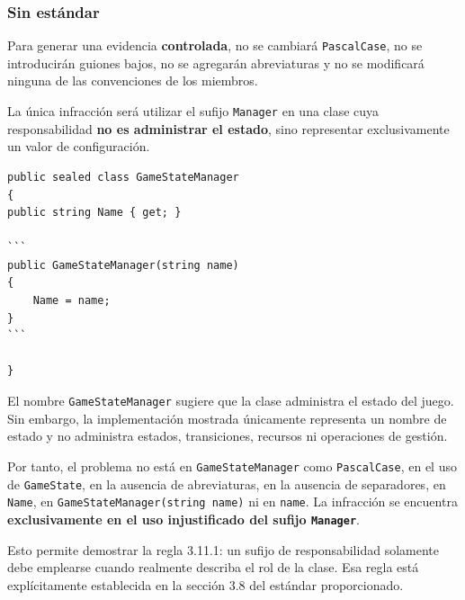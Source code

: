 \subsubsection{Sin estándar}

Para generar una evidencia \textbf{controlada}, no se cambiará \texttt{PascalCase}, no se introducirán guiones bajos, no se agregarán abreviaturas y no se modificará ninguna de las convenciones de los miembros.

La única infracción será utilizar el sufijo \texttt{Manager} en una clase cuya responsabilidad \textbf{no es administrar el estado}, sino representar exclusivamente un valor de configuración.

\begin{lstlisting}[style=csharpstyle]
public sealed class GameStateManager
{
public string Name { get; }

```
public GameStateManager(string name)
{
    Name = name;
}
```

}
\end{lstlisting}

El nombre \texttt{GameStateManager} sugiere que la clase administra el estado del juego. Sin embargo, la implementación mostrada únicamente representa un nombre de estado y no administra estados, transiciones, recursos ni operaciones de gestión.

Por tanto, el problema no está en \texttt{GameStateManager} como \texttt{PascalCase}, en el uso de \texttt{GameState}, en la ausencia de abreviaturas, en la ausencia de separadores, en \texttt{Name}, en \texttt{GameStateManager(string name)} ni en \texttt{name}. La infracción se encuentra \textbf{exclusivamente en el uso injustificado del sufijo \texttt{Manager}}.

Esto permite demostrar la regla 3.11.1: un sufijo de responsabilidad solamente debe emplearse cuando realmente describa el rol de la clase. Esa regla está explícitamente establecida en la sección 3.8 del estándar proporcionado.
